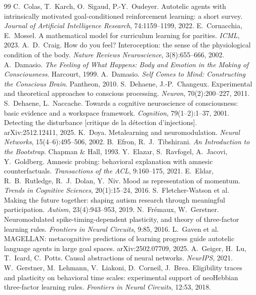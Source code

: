 \documentclass[11pt,a4paper]{article}
\begin{document}
\begin{thebibliography}{99}
 C.~Colas, T.~Karch, O.~Sigaud, P.-Y.~Oudeyer. Autotelic agents with intrinsically motivated goal-conditioned reinforcement learning: a short survey. \emph{Journal of Artificial Intelligence Research}, 74:1159--1199, 2022.
 E.~Cornacchia, E.~Mossel. A mathematical model for curriculum learning for parities. \emph{ICML}, 2023.
 A.~D.~Craig. How do you feel? Interoception: the sense of the physiological condition of the body. \emph{Nature Reviews Neuroscience}, 3(8):655--666, 2002.
 A.~Damasio. \emph{The Feeling of What Happens: Body and Emotion in the Making of Consciousness}. Harcourt, 1999.
 A.~Damasio. \emph{Self Comes to Mind: Constructing the Conscious Brain}. Pantheon, 2010.
 S.~Dehaene, J.-P.~Changeux. Experimental and theoretical approaches to conscious processing. \emph{Neuron}, 70(2):200--227, 2011.
 S.~Dehaene, L.~Naccache. Towards a cognitive neuroscience of consciousness: basic evidence and a workspace framework. \emph{Cognition}, 79(1--2):1--37, 2001.
 Detecting the disturbance [critique de la détection d'injections]. arXiv:2512.12411, 2025.
 K.~Doya. Metalearning and neuromodulation. \emph{Neural Networks}, 15(4--6):495--506, 2002.
 B.~Efron, R.~J.~Tibshirani. \emph{An Introduction to the Bootstrap}. Chapman \& Hall, 1993.
 Y.~Elazar, S.~Ravfogel, A.~Jacovi, Y.~Goldberg. Amnesic probing: behavioral explanation with amnesic counterfactuals. \emph{Transactions of the ACL}, 9:160--175, 2021.
 E.~Eldar, R.~B.~Rutledge, R.~J.~Dolan, Y.~Niv. Mood as representation of momentum. \emph{Trends in Cognitive Sciences}, 20(1):15--24, 2016.
 S.~Fletcher-Watson et al. Making the future together: shaping autism research through meaningful participation. \emph{Autism}, 23(4):943--953, 2019.
 N.~Frémaux, W.~Gerstner. Neuromodulated spike-timing-dependent plasticity, and theory of three-factor learning rules. \emph{Frontiers in Neural Circuits}, 9:85, 2016.
 L.~Gaven et al. MAGELLAN: metacognitive predictions of learning progress guide autotelic language agents in large goal spaces. arXiv:2502.07709, 2025.
 A.~Geiger, H.~Lu, T.~Icard, C.~Potts. Causal abstractions of neural networks. \emph{NeurIPS}, 2021.
 W.~Gerstner, M.~Lehmann, V.~Liakoni, D.~Corneil, J.~Brea. Eligibility traces and plasticity on behavioral time scales: experimental support of neoHebbian three-factor learning rules. \emph{Frontiers in Neural Circuits}, 12:53, 2018.

\end{thebibliography}
\end{document}
